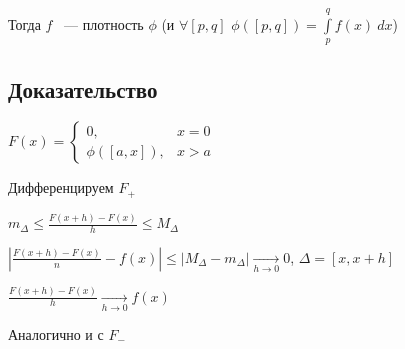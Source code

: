\documentclass[../main.tex]{subfiles}
\begin{document}
            Тогда $f$ ~--- плотность $\phi$ (и $\forall [p, q]$ $\phi([p, q]) = \int\limits^q_p f(x) \ dx$)
        
        \subsection*{Доказательство}
        
            $F(x) = \begin{cases} 0, & x = 0 \\ \phi([a, x]), & x > a \end{cases}$
        
            Дифференцируем $F_+$
        
            $m_{\Delta} \leq \frac{F(x+ h) - F(x)}{h} \leq M_{\Delta}$
        
            $\left| \frac{F(x + h) - F(x)}{n} - f(x) \right| \leq \left| M_{\Delta} - m_{\Delta} \right| \xrightarrow[h \rightarrow 0]{} 0$, $\Delta = [x, x + h]$
        
            $\frac{F(x + h) - F(x)}{h} \xrightarrow[h \rightarrow 0]{} f(x)$
        
            Аналогично и с $F_-$
\newpage
\end{document}

